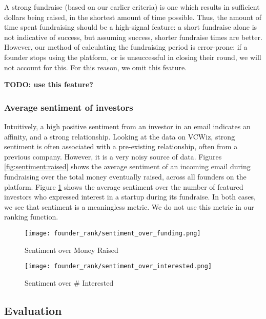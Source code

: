 A strong fundraise (based on our earlier criteria) is one which results in sufficient dollars being raised, in the shortest amount of time possible. Thus, the amount of time spent fundraising should be a high-signal feature: a short fundraise alone is not indicative of success, but assuming success, shorter fundraise times are better. However, our method of calculating the fundraising period is error-prone: if a founder stops using the platform, or is unsuccessful in closing their round, we will not account for this. For this reason, we omit this feature.

\textbf{TODO: use this feature?}

\subsubsection{Average sentiment of investors}

Intuitively, a high positive sentiment from an investor in an email indicates an affinity, and a strong relationship. Looking at the data on VCWiz, strong sentiment is often associated with a pre-existing relationship, often from a previous company. However, it is a very noisy source of data. Figures \ref{fig:sentiment:raised} shows the average sentiment of an incoming email during fundraising over the total money eventually raised, across all founders on the platform. Figure \ref{fig:sentiment:interested} shows the average sentiment over the number of featured investors who expressed interest in a startup during its fundraise. In both cases, we see that sentiment is a meaningless metric. We do not use this metric in our ranking function.

\begin{figure}[ht]
  \centering
  \begin{minipage}[t]{0.48\textwidth}
    \centering
    \texttt{[image: founder\_rank/sentiment\_over\_funding.png]}
    \caption{Sentiment over Money Raised}
    \label{fig:sentiment:raised}
  \end{minipage}\hfill
  \begin{minipage}[t]{0.48\textwidth}
    \centering
    \texttt{[image: founder\_rank/sentiment\_over\_interested.png]}
    \caption{Sentiment over \# Interested}
    \label{fig:sentiment:interested}
  \end{minipage}
\end{figure}

\subsection{Evaluation}


